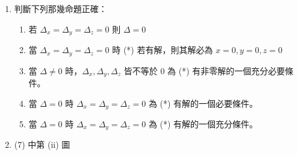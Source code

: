 \begin{enumerate}[label=(\arabic*), resume, leftmargin=2em]
\begin{figure}[H]
\begin{subfigure}[b]{0.34\textwidth}
  \caption*{(iii)}
  \end{subfigure}
  \caption{空間向量幾何關係示意圖}
  \label{fig:b3-a2-1}
  \end{figure}

  \begin{enumerate}[label=\textcircled{\arabic*}, leftmargin=2em]
    \item $\Delta = 0$ 且 $\Delta_x = \Delta_y = \Delta_z = 0$
    \item $\Delta = 0$ 且 $\Delta_x = 0, \Delta_y = 0, \Delta_z \neq 0$
    \item $\Delta \neq 0$ 且 $\Delta_x = 0, \Delta_y \neq 0, \Delta_z = 0$
    \item $\Delta = 0$ 且 $\Delta_x \neq 0, \Delta_y \neq 0, \Delta_z = 0$
    \item $\Delta \neq 0$ 且 $\Delta_x = 0, \Delta_y = 0, \Delta_z \neq 0$
  \end{enumerate}

  \item 判斷下列那幾命題正確：
  \begin{enumerate}[label=\textcircled{\arabic*}, leftmargin=2em]
    \item 若 $\Delta_x = \Delta_y = \Delta_z = 0$ 則 $\Delta = 0$
    \item 當 $\Delta_x = \Delta_y = \Delta_z = 0$ 時 (*) 若有解，則其解必為 $x = 0, y = 0, z = 0$
    \item 當 $\Delta \neq 0$ 時，$\Delta_x, \Delta_y, \Delta_z$ 皆不等於 0 為 (*) 有非零解的一個充分必要條件。
    \item 當 $\Delta = 0$ 時 $\Delta_x = \Delta_y = \Delta_z = 0$ 為 (*) 有解的一個必要條件。
    \item 當 $\Delta = 0$ 時 $\Delta_x = \Delta_y = \Delta_z = 0$ 為 (*) 有解的一個充分條件。
  \end{enumerate}

  \item (7) 中第 (ii) 圖


\end{enumerate}
